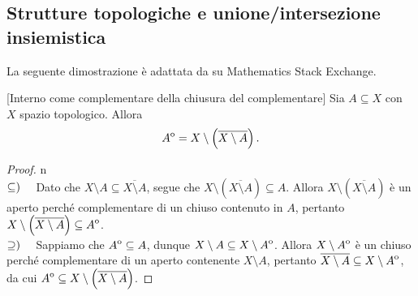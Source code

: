 \subsection{Strutture topologiche e unione/intersezione insiemistica}
La seguente dimostrazione è adattata da \cite{shalop:interior} su Mathematics Stack Exchange.
\begin{lemma}{}[Interno come complementare della chiusura del complementare]
Sia $A\subseteq X$ con $X$ spazio topologico. Allora
\begin{equation*}
	{\kern0ptA}^{\mathrm{o}}=X\setminus\left(\overline{X\setminus A}\right).
\end{equation*}
\end{lemma}
\begin{proof}{n}~{}\\
$\subseteq)\quad$ Dato che $X\setminus A\subseteq \overline{X\setminus A}$, segue che $X\setminus \left(\overline{X\setminus A}\right)\subseteq A$. Allora $X\setminus \left(\overline{X\setminus A}\right)$ è un aperto perché complementare di un chiuso contenuto in $A$, pertanto $X\setminus \left(\overline{X\setminus A}\right)\subseteq {\kern0ptA}^{\mathrm{o}}$.\\
$\supseteq)\quad$ Sappiamo che ${\kern0ptA}^{\mathrm{o}}\subseteq A$, dunque $X\setminus A\subseteq X\setminus {\kern0ptA}^{\mathrm{o}}$. Allora $X\setminus {\kern0ptA}^{\mathrm{o}}$ è un chiuso perché complementare di un aperto contenente $X\setminus A$, pertanto $\overline{X\setminus A}\subseteq X\setminus {\kern0ptA}^{\mathrm{o}}$, da cui ${\kern0ptA}^{\mathrm{o}}\subseteq X\setminus\left(\overline{X\setminus A}\right)$.\qedhere
\end{proof}
